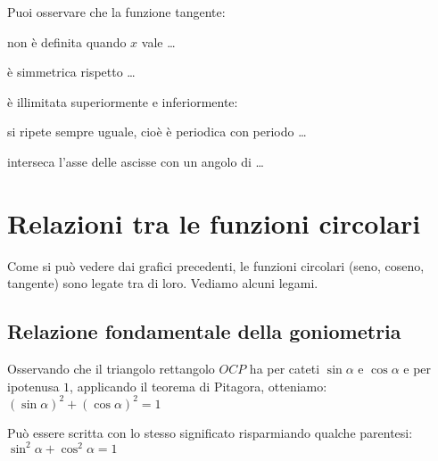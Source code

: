  \vspace{-6pt}
  \begin{center}
\begin{inaccessibleblock}
%     
\tanwithlabel
\end{inaccessibleblock}
  \end{center}
   \vspace{-24pt}

\newpage %

Puoi osservare che la funzione tangente:
\begin{itemize*}
 \item non è definita quando \(x\) vale \dots
 \item è simmetrica rispetto \dots
 \item è illimitata superiormente e inferiormente:
 \item si ripete sempre uguale, cioè è periodica con periodo \dots
 \item interseca l'asse delle ascisse con un angolo di \dots
\end{itemize*}

\section{Relazioni tra le funzioni circolari}
\label{sec:gonio_relazioni}

Come si può vedere dai grafici precedenti, le funzioni circolari (seno, 
coseno, 
tangente) sono legate tra di loro. Vediamo alcuni legami.

\subsection{Relazione fondamentale della goniometria}

Osservando che il triangolo rettangolo \(OCP\) ha per cateti \(\sin \alpha\) 
e \(\cos \alpha\) e per ipotenusa \(1\), applicando il teorema di Pitagora, 
otteniamo:
\(\left(\sin \alpha \right)^2 + \left(\cos \alpha \right)^2 = 1\)

Può essere scritta con lo stesso significato risparmiando qualche parentesi:
\(\sin^2 \alpha + \cos^2 \alpha = 1\)

